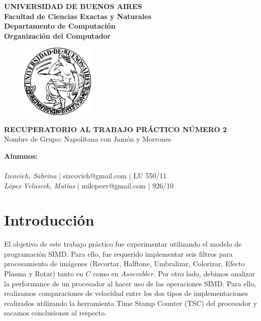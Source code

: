 \documentclass[10pt, a4paper]{article}
\begin{document}
\thispagestyle{empty}
\begin{center}

\Huge{ \bf{UNIVERSIDAD DE BUENOS AIRES}}
\\
\LARGE{\bf{Facultad de Ciencias Exactas y Naturales}}
\\
\textbf{Departamento de Computaci\'on}
\\
\textbf{Organizaci\'on del Computador}
\vspace{2.0\baselineskip}
\end{center}


\begin{figure}[h] %
\begin{center}
\includegraphics[width=100pt]{./image.jpeg}
\end{center}
\end{figure}
\begin{center}
\vspace*{0.7cm}

\huge{\bf RECUPERATORIO AL TRABAJO PR\'ACTICO N\'UMERO 2}\\
\huge{Nombre de Grupo: Napolitana con Jam\'on y Morrones}
\vspace*{8cm}

\end{center}

\huge{\textbf{Alumnos:}}\\
\\
\vspace*{0.3cm}
\Large{\textsl{Izcovich, Sabrina} $|$ sizcovich@gmail.com $|$ LU 550/11}\\
\vspace*{0.3cm}
\Large{\textsl{L\'opez Veluscek, Matías} \hspace{0.1cm}$|$ milopezv@gmail.com $|$ 926/10}\\
\vspace*{0.3cm}
 
\newpage
\thispagestyle{empty}
\tableofcontents
\newpage
\section{Introducci\'on}
El objetivo de este trabajo pr\'actico fue experimentar utilizando el modelo de programaci\'on SIMD. Para ello, fue requerido implementar seis filtros para procesamiento de im\'agenes (Recortar, Halftone, Umbralizar, Colorizar, Efecto Plasma y Rotar) tanto en $C$ como en $Assembler$.\newline
Por otro lado, debimos analizar la performance de un procesador al hacer uso de las operaciones SIMD. Para ello, realizamos comparaciones de velocidad entre los dos tipos de implementaciones realizados utilizando la herramienta Time Stamp Counter (TSC) del procesador y sacamos conclusiones al respecto.
\end{document}
